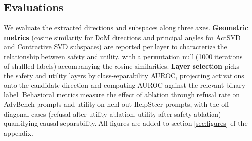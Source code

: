 \subsection{Evaluations}
We evaluate the extracted directions and subspaces along three axes.
\textbf{Geometric metrics} (cosine similarity for DoM directions and
principal angles for ActSVD and Contrastive SVD subspaces) are
reported per layer to characterize the relationship between safety
and utility, with a permutation null (1000 iterations of shuffled
labels) accompanying the cosine similarities.
\textbf{Layer selection} picks the safety and utility layers by class-separability AUROC, projecting
activations onto the candidate direction and computing AUROC against
the relevant binary label. Behavioral metrics measure the effect of
ablation through refusal rate on AdvBench prompts and utility on
held-out HelpSteer prompts, with the off-diagonal cases (refusal
after utility ablation, utility after safety ablation) quantifying
causal separability. All figures are added to section \ref{sec:figures} of the appendix.